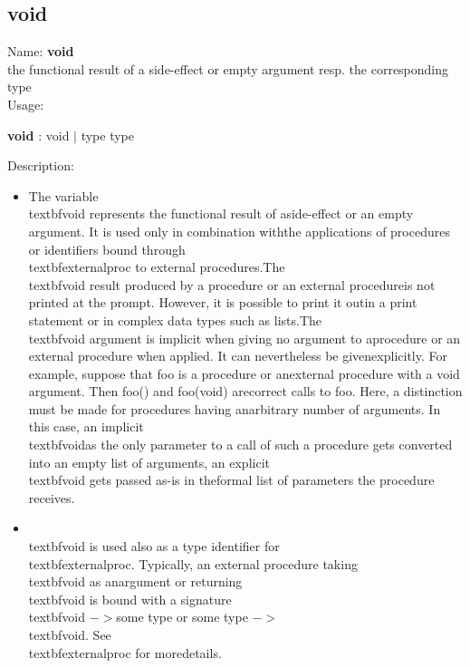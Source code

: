 \subsection{void}
\label{labvoid}
\noindent Name: \textbf{void}\\
the functional result of a side-effect or empty argument resp. the corresponding type\\
\noindent Usage: 
\begin{center}
\textbf{void} : \textsf{void} $|$ \textsf{type type}\\
\end{center}
\noindent Description: \begin{itemize}

\item The variable \\textbf{void} represents the functional result of a\n   side-effect or an empty argument.  It is used only in combination with\n   the applications of procedures or identifiers bound through\n   \\textbf{externalproc} to external procedures.\n    \n   The \\textbf{void} result produced by a procedure or an external procedure\n   is not printed at the prompt. However, it is possible to print it out\n   in a print statement or in complex data types such as lists.\n    \n   The \\textbf{void} argument is implicit when giving no argument to a\n   procedure or an external procedure when applied. It can nevertheless be given\n   explicitly.  For example, suppose that foo is a procedure or an\n   external procedure with a void argument. Then foo() and foo(void) are\n   correct calls to foo. Here, a distinction must be made for procedures having an\n   arbitrary number of arguments. In this case, an implicit \\textbf{void}\n   as the only parameter to a call of such a procedure gets converted into \n   an empty list of arguments, an explicit \\textbf{void} gets passed as-is in the\n   formal list of parameters the procedure receives.\n
\item \\textbf{void} is used also as a type identifier for\n   \\textbf{externalproc}. Typically, an external procedure taking \\textbf{void} as an\n   argument or returning \\textbf{void} is bound with a signature \\textbf{void} $->$\n   some type or some type $->$ \\textbf{void}. See \\textbf{externalproc} for more\n   details.\n\end{itemize}
